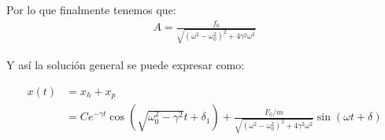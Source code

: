 \documentclass[letterpaper,11pt]{article}
\begin{document}
\noindent Por lo que finalmente tenemos que:
\begin{align*}
    A = \frac{f_0}{\sqrt{(\omega^2-\omega_0^2)^2+4\gamma^2\omega^2}}
\end{align*}

\noindent Y así la solución general se puede expresar como:

\begin{align*}
    x(t) &= x_h + x_p\\
    &= C e^{-\gamma t}\cos{\left(\sqrt{\omega_0^2-\gamma^2}t+\delta_1\right)} + \frac{F_0/m}{\sqrt{(\omega^2-\omega_0^2)^2+4\gamma^2\omega^2}}\sin{(\omega t+\delta)}
\end{align*}
\end{document}
